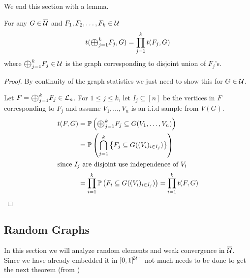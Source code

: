 \documentclass{article}
\begin{document}
We end this section with a lemma.

\begin{lemma}
  \label{lem:disjoint}
  For any $G \in \Ug*$ and $F_1, F_2, \ldots, F_k \in \Ug$ 
  \begin{equation}
    t(\Oplus_{j=1}^k F_j, G) = \prod_{j=1}^k t(F_j, G)
    \label{eq:tdirectsum}
  \end{equation}
  where $\Oplus_{j=1}^k F_j \in \Ug$ is the graph corresponding to disjoint union of $F_j$'s.
\end{lemma}
\begin{proof}
  By continuity of the graph statistics we just need to show this for $G \in \Ug$. 

  Let $F = \Oplus_{j=1}^k F_j \in \Lg_{n}$. For $1 \leq j \leq k$, let $I_j \subseteq [n]$ be the vertices in $F$ corresponding to $F_j$ and assume $V_1,\dots, V_n$ is an i.i.d sample from $V(G)$.
  \begin{align*}
    t(F, G) &= \Pb(\Oplus_{j=1}^k F_j  \subseteq G(V_1,\dots,V_n)) \\
    &= \Pb(\bigcap_{j=1}^k \set{F_j \subseteq G((V_i)_{i \in I_j})}) \\
    \shortintertext{since $I_j$ are disjoint use independence of $V_i$}
    &= \prod_{i=1}^k \Pb(F_i \subseteq G((V_i)_{i \in I_j})) = \prod_{i=1}^k t(F, G)
  \end{align*}
\end{proof}

\subsection{Random Graphs}

In this section we will analyze random elements and weak convergence in $\Ug*$. Since we have already embedded it in $[0,1]^{\Ug^+}$ not much needs to be done to get the next theorem (from \cite{paper})
\end{document}
